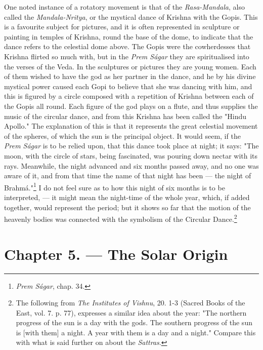 \documentclass[a4paper, 11pt, oneside, polutonikogreek, english]{article}
\begin{document}
One noted instance of a rotatory movement is that of the \emph{Rasa-Mandala}, also called the \emph{Mandala-Nritya}, or the mystical dance of Krishna with the Gopis. This is a favourite subject for pictures, and it is often represented in sculpture or painting in temples of Krishna, round the base of the dome, to indicate that the dance refers to the celestial dome above. The Gopis were the cowherdesses that Krishna flirted so much with, but in the \emph{Prem Ságar} they are spiritualised into the verses of the Veda. In the sculptures or pictures they are young women. Each of them wished to have the god as her partner in the dance, and he by his divine mystical power caused each Gopi to believe that she was dancing with him, and this is figured by a circle composed with a repetition of Krishna between each of the Gopis all round. Each figure of the god plays on a flute, and thus supplies the music of the circular dance, and from this Krishna has been called the "Hindu Apollo." The explanation of this is that it represents the great celestial movement of the spheres, of which the sun is the principal object. It would seem, if the \emph{Prem Ságar} is to be relied upon, that this dance took place at night; it says: "The moon, with the circle of stars, being fascinated, was pouring down nectar with its rays. Meanwhile, the night advanced and six months passed away, and no one was aware of it, and from that time the name of that night has been --- the night of Brahmá."\footnote{\emph{Prem Ságar}, chap. 34.} I do not feel sure as to how this night of six months is to be interpreted, --- it might mean the night-time of the whole year, which, if added together, would represent the period; but it shows so far that the motion of the heavenly bodies was connected with the symbolism of the Circular Dance.\footnote{The following from \emph{The Institutes of Vishnu}, 20. 1-3 (Sacred Books of the East, vol. 7. p. 77), expresses a similar idea about the year: "The northern progress of the sun is a day with the gods. The southern progress of the sun is [with them] a night. A year with them is a day and a night." Compare this with what is said further on about the \emph{Sattras}.}
\clearpage
\section{Chapter 5. --- The Solar Origin}
\end{document}
